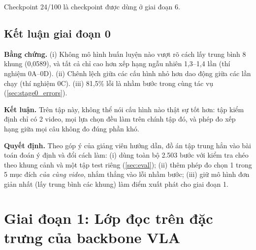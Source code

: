 \documentclass[a4paper,oneside]{report}
\begin{document}
\begin{table}[ht]
\centering
\caption{Chạy thử 500 bước trên LIBERO-10, hạt giống 0: SmolVLA gốc và SmolVLA có ý định biết trước.}
\label{tab:oracle_pilot}
\small
{}
\end{table} Checkpoint 24/100 là checkpoint được dùng ở giai đoạn 6.

\subsection{Kết luận giai đoạn 0}
\label{sec:stage0_conclusion}

\begin{ketqua}
\textbf{Bằng chứng.} (i) Không mô hình huấn luyện nào vượt rõ cách lấy trung bình 8 khung (0,0589), và tất cả chỉ cao hơn xếp hạng ngẫu nhiên 1,3--1,4 lần (thí nghiệm 0A--0D). (ii) Chênh lệch giữa các cấu hình nhỏ hơn dao động giữa các lần chạy (thí nghiệm 0C). (iii) 81,5\% lỗi là nhầm bước trong cùng tác vụ (\cref{sec:stage0_errors}).

\textbf{Kết luận.} Trên tập này, không thể nói cấu hình nào thật sự tốt hơn: tập kiểm định chỉ có 2 video, mọi lựa chọn đều làm trên chính tập đó, và phép đo xếp hạng giữa mọi câu không đo đúng phần khó.

\textbf{Quyết định.} Theo góp ý của giảng viên hướng dẫn, đồ án tập trung hẳn vào bài toán đoán ý định và đổi cách làm: (i) dùng toàn bộ 2.503 bước với kiểm tra chéo theo khung cảnh và một tập test riêng (\cref{sec:eval}); (ii) thêm phép đo chọn 1 trong 5 mục đích \textit{của cùng video}, nhắm thẳng vào lỗi nhầm bước; (iii) giữ mô hình đơn giản nhất (lấy trung bình các khung) làm điểm xuất phát cho giai đoạn 1.
\end{ketqua}

\section{Giai đoạn 1: Lớp đọc trên đặc trưng của backbone VLA}
\label{sec:stage1}
\end{document}
